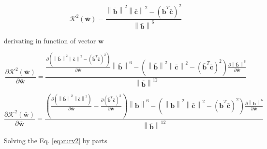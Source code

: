 \begin{equation}
\mathcal{K}^{2}(\mathbf{\bar{w}})
=
\frac{
\left\|
\mathbf{\bar{b}} 
\right\|^{2}
\left\|
\mathbf{\bar{c}}
\right\|^{2}
-
\left(
\mathbf{\bar{b}}^{T}
\mathbf{\bar{c}}
\right)^{2}
}
{\left\| \mathbf{\bar{b}} \right\|^{6}}
\end{equation}

derivating in function of vector $\mathbf{w}$

\begin{equation}
\frac{
\partial 
\mathcal{K}^{2}(\mathbf{\bar{w}})
}
{
\partial \mathbf{\bar{w}}
}
=
\frac{
\frac{
\partial 
\left(
\left\|
\mathbf{\bar{b}} 
\right\|^{2}
\left\|
\mathbf{\bar{c}}
\right\|^{2}
-
\left(
\mathbf{\bar{b}}^{T}
\mathbf{\bar{c}}
\right)^{2}
\right)
}
{\partial \mathbf{\bar{w}}}
\left\| \mathbf{\bar{b}} \right\|^{6}
-
\left(
\left\|
\mathbf{\bar{b}} 
\right\|^{2}
\left\|
\mathbf{\bar{c}}
\right\|^{2}
-
\left(
\mathbf{\bar{b}}^{T}
\mathbf{\bar{c}}
\right)^{2}
\right)
\frac{
\partial
\left\| \mathbf{\bar{b}} \right\|^{6}
}
{
\partial \mathbf{\bar{w}}
}
}
{\left\| \mathbf{\bar{b}} \right\|^{12}}
\end{equation}



\begin{equation}\label{eq:curv2}
\frac{
\partial 
\mathcal{K}^{2}(\mathbf{\bar{w}})
}
{
\partial \mathbf{\bar{w}}
}
=
\frac{
\left(
\frac{
\partial 
\left(
\left\|\mathbf{\bar{b}}\right\|^2
\left\|\mathbf{\bar{c}}\right\|^2
\right)
}
{\partial \mathbf{\bar{w}}}
-
\frac{
\partial
\left(
\mathbf{\bar{b}}^{T}
\mathbf{\bar{c}}
\right)^{2}
}
{\partial \mathbf{\bar{w}}}
\right)
\left\| \mathbf{\bar{b}} \right\|^{6}
-
\left(
\left\|
\mathbf{\bar{b}} 
\right\|^{2}
\left\|
\mathbf{\bar{c}}
\right\|^{2}
-
\left(
\mathbf{\bar{b}}^{T}
\mathbf{\bar{c}}
\right)^{2}
\right)
\frac{
\partial
\left\| \mathbf{\bar{b}} \right\|^{6}
}
{
\partial \mathbf{\bar{w}}
}
}
{\left\| \mathbf{\bar{b}} \right\|^{12}}
\end{equation}

Solving \cite[pp. 11]{petersen2008matrix} the Eq. \ref{eq:curv2} by parts


